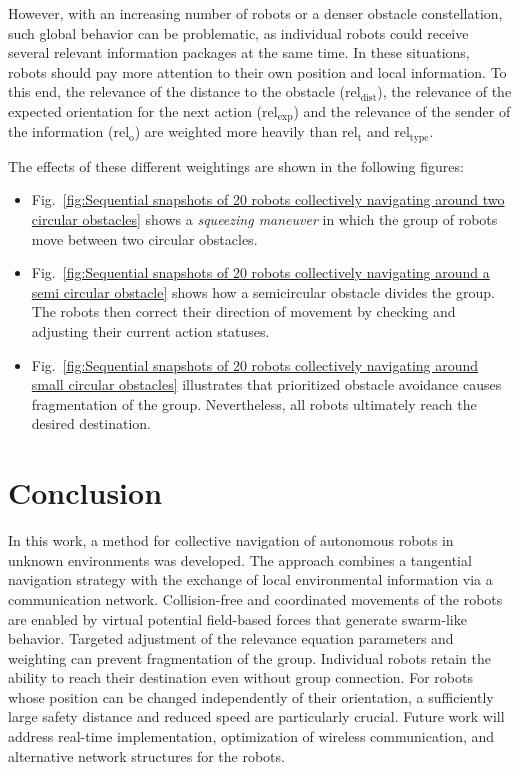 \documentclass[conference]{IEEEtran}
\begin{document}
However, with an increasing number of robots or a denser obstacle constellation, 
such global behavior can be problematic, as individual 
robots could receive several relevant information packages at the same time. 
In these situations, robots should pay more attention to their own position and local 
information. To this end, the relevance of the distance to the obstacle 
($\mathrm{rel}_{\mathrm{dist}}$), the relevance of the expected orientation for the next action 
($\mathrm{rel}_{\mathrm{exp}}$) and the relevance of the sender of the information ($\mathrm{rel}_{\mathrm{o}}$) 
are weighted more heavily than $\mathrm{rel}_{\mathrm{t}}$ and $\mathrm{rel}_{\mathrm{type}}$.

The effects of these different weightings are shown in the following figures:
\begin{itemize}
\item Fig.~\ref{fig:Sequential snapshots of 20 robots collectively navigating around two 
circular obstacles} 
shows a \textit{squeezing maneuver} in which the 
group of robots move between two circular obstacles.
\item Fig.~\ref{fig:Sequential snapshots of 20 robots collectively navigating around a 
semi circular obstacle} 
shows how a semicircular obstacle 
divides the group. The robots then correct their direction of movement 
by checking and adjusting their current action statuses.
\item Fig.~\ref{fig:Sequential snapshots of 20 robots collectively navigating around 
small circular obstacles} illustrates that prioritized 
obstacle avoidance causes fragmentation of the group. 
Nevertheless, all robots ultimately reach the desired destination.
\end{itemize}


\section{Conclusion}
In this work, a method for collective navigation of autonomous robots in unknown environments 
was developed. The approach combines a tangential navigation strategy with the exchange of local 
environmental information via a communication network. Collision-free and coordinated movements 
of the robots are enabled by virtual potential field-based forces that generate swarm-like behavior. 
Targeted adjustment of the relevance equation parameters and weighting can prevent fragmentation 
of the group. Individual robots retain the ability to reach their destination even without 
group connection. For robots whose position can be changed independently of their orientation, a sufficiently large safety distance and reduced speed are particularly crucial. 
Future work will address real-time implementation, optimization of wireless communication, 
and alternative network structures for the robots.
\end{document}
